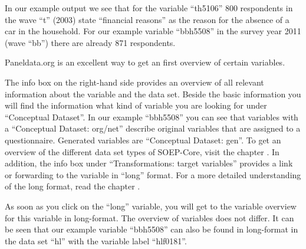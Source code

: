 \documentclass[letterpaper,10pt,openany,onesideH,english]{sphinxmanual}
\begin{document}
In our example output we see that for the variable “th5106” 800 respondents in the wave “t” (2003) state “financial reasons” as the reason for the absence of a car in the household. For our example variable “bbh5508” in the survey year 2011 (wave “bb”) there are already 871 respondents.

Paneldata.org is an excellent way to get an first overview of certain variables.

\begin{figure}[H]
\centering

\noindent{}
\end{figure}

\begin{figure}[H]
\centering

\noindent{}
\end{figure}

The info box on the right-hand side provides an overview of all relevant information about the variable and the data set. Beside the basic information you will find the information what kind of variable you are looking for under “Conceptual Dataset”. In our example “bbh5508” you can see that variables with a “Conceptual Dataset: org/net” describe original variables that are assigned to a questionnaire. Generated variables are  “Conceptual Dataset: gen”. To get an overview of the different data set types of SOEP-Core, visit the chapter {\hyperref[\detokenize{Principles of Data Structure/index:overview}]{}}. In addition, the info box under “Transformations: target variables” provides a link or forwarding to the variable in “long” format. For a more detailed understanding of the long format, read the chapter {\hyperref[\detokenize{Principles of Data Structure/index:datasets-long}]{}}.

\begin{figure}[H]
\centering

\noindent{}
\end{figure}

As soon as you click on the “long” variable, you will get to the variable overview for this variable in long-format. The overview of variables does not differ. It can be seen that our example variable “bbh5508” can also be found in long-format in the data set “hl” with the variable label “hlf0181”.
\end{document}
